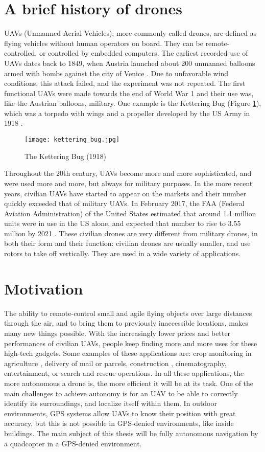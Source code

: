 \section{A brief history of drones}
UAVs (Unmanned Aerial Vehicles), more commonly called drones, are defined as flying vehicles without human operators on board. They can be remote-controlled, or controlled by embedded computers. The earliest recorded use of UAVs dates back to 1849, when Austria launched about 200 unmanned balloons armed with bombs against the city of Venice \cite{anthology}. Due to unfavorable wind conditions, this attack failed, and the experiment was not repeated. The first functional UAVs were made towards the end of World War 1 and their use was, like the Austrian balloons, military. One example is the Kettering Bug (Figure \ref{fig:ketteringbug}), which was a torpedo with wings and a propeller developed by the US Army in 1918 \cite{dronesww1}.
\begin{figure}[H]
  \centering
  \texttt{[image: kettering\_bug.jpg]}
    \caption{The Kettering Bug (1918)}
    \label{fig:ketteringbug}
\end{figure}

Throughout the 20th century, UAVs become more and more sophisticated, and were used more and more, but always for military purposes. In the more recent years, civilian UAVs have started to appear on the markets and their number quickly exceeded that of military UAVs. In February 2017, the FAA (Federal Aviation Administration) of the United States estimated that around 1.1 million units were in use in the US alone, and expected that number to rise to 3.55 million by 2021 \cite{consumerdronesbythenumbers}. These civilian drones are very different from military drones, in both their form and their function: civilian drones are usually smaller, and use rotors to take off vertically. They are used in a wide variety of applications.

\section{Motivation}
The ability to remote-control small and agile flying objects over large distances through the air, and to bring them to previously inaccessible locations, makes many new things possible. With the increasingly lower prices and better performances of civilian UAVs, people keep finding more and more uses for these high-tech gadgets. Some examples of these applications are: crop monitoring in agriculture \cite{agriculturaldrones}, delivery of mail or parcels, construction \cite{batiravecdesdrones}, cinematography, entertainment, or search and rescue operations. In all these applications, the more autonomous a drone is, the more efficient it will be at its task. One of the main challenges to achieve autonomy is for an UAV to be able to correctly identify its surroundings, and localize itself within them. In outdoor environments, GPS systems allow UAVs to know their position with great accuracy, but this is not possible in GPS-denied environments, like inside buildings. The main subject of this thesis will be fully autonomous navigation by a quadcopter in a GPS-denied environment.

